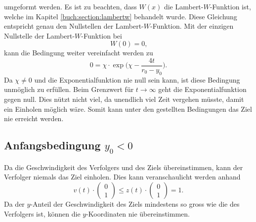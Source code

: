 umgeformt werden.
Es ist zu beachten, dass $W(x)$ die Lambert-\(W\)-Funktion ist,
welche im Kapitel  \eqref{buch:section:lambertw} behandelt wurde.
Diese Gleichung entspricht genau den Nullstellen der Lambert-\(W\)-Funktion.
Mit der einzigen Nullstelle der Lambert-\(W\)-Funktion bei
\begin{equation*}
    W(0)=0
    \text{,}
\end{equation*}
kann die Bedingung weiter vereinfacht werden zu
\begin{equation}
    0
    =
    \chi\cdot \exp\biggl( \chi-\frac{4t}{r_0-y_0}\biggr)
    \text{.}
\end{equation}
Da $\chi\neq0$ und die Exponentialfunktion nie null sein kann, ist diese Bedingung unmöglich zu erfüllen.
Beim Grenzwert für $t\rightarrow\infty$ geht die Exponentialfunktion gegen null.
Dies nützt nicht viel, da unendlich viel Zeit vergehen müsste, damit ein Einholen möglich wäre.
Somit kann unter den gestellten Bedingungen das Ziel nie erreicht werden.
%
%
%
%
%
%
%
%
%
\subsection{Anfangsbedingung $y_0<0$}
Da die Geschwindigkeit des Verfolgers und des Ziels übereinstimmen, kann der Verfolger niemals das Ziel einholen.
Dies kann veranschaulicht werden anhand
%
\begin{equation}
    v(t)\cdot \begin{pmatrix} 0 \\ 1 \end{pmatrix}
    \leq
    z(t)\cdot \begin{pmatrix} 0 \\ 1 \end{pmatrix}
    =
    1\text{.}
\end{equation}
%
Da der $y$-Anteil der Geschwindigkeit des Ziels mindestens so gross wie die des Verfolgers ist, können die $y$-Koordinaten nie übereinstimmen.
%
